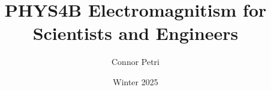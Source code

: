 \documentclass[12pt, letterpaper]{article}
\title{PHYS4B Electromagnitism for Scientists and Engineers}
\author{Connor Petri}
\date{Winter 2025}
\begin{document}
\maketitle
\tableofcontents
\pagebreak




\end{document}
